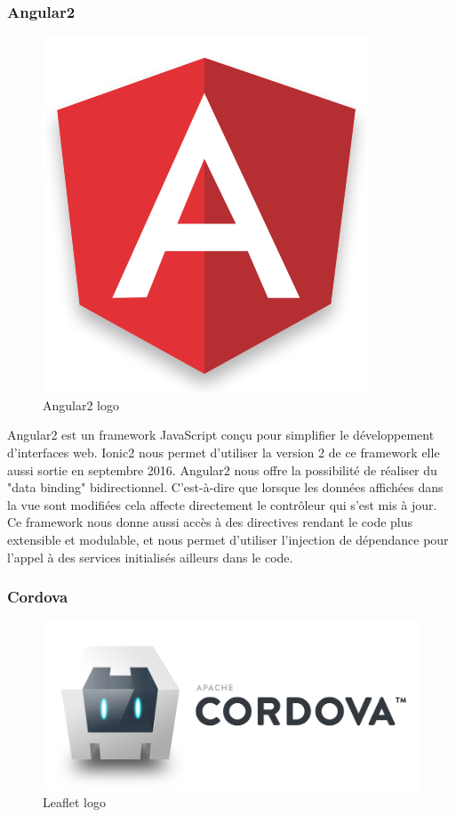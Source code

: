 \documentclass[french]{article}
\begin{document}
	\subsubsection{Angular2}
	
	\begin{figure}[H]
		\centering
		\includegraphics[scale=0.4]{../images/angular2-logo.png}
		\caption{Angular2 logo}
		\label{Angular2 logo}
	\end{figure} 
	
	Angular2 est un framework JavaScript conçu pour simplifier le développement d'interfaces web. Ionic2 nous permet d'utiliser la version 2 de ce framework elle aussi sortie en septembre 2016. 
	Angular2 nous offre la possibilité de réaliser du "data binding" bidirectionnel. C'est-à-dire que lorsque les données affichées dans la vue sont modifiées cela affecte directement le contrôleur qui s'est mis à jour. Ce framework nous donne aussi accès à des directives rendant le code plus extensible et modulable, et nous permet d'utiliser l'injection de dépendance pour l'appel à des services initialisés ailleurs dans le code. 
	
	\subsubsection{Cordova}
	
	\begin{figure}[H]
		\centering
		\includegraphics[scale=0.4]{../images/cordova-logo.png}
		\caption{Leaflet logo}
		\label{Leaflet logo}
	\end{figure} 
	
\end{document}
